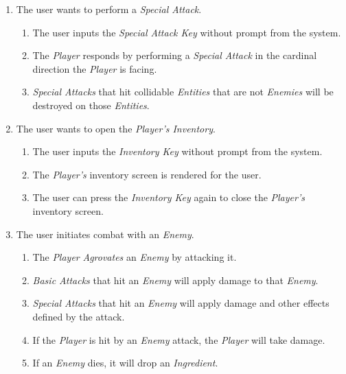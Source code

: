 \documentclass[12pt, titlepage]{article}
\begin{document}
\begin{enumerate}[{VP}1.]
\begin{enumerate}[{BE1}.1]
    \item The user wants to perform a \textit{Special Attack}.
    \begin{enumerate}
      \item The user inputs the \textit{Special Attack Key} without prompt from the system.
      \item The \textit{Player} responds by performing a \textit{Special Attack} in the cardinal direction the \textit{Player} is facing.
      \item \textit{Special Attacks} that hit collidable \textit{Entities} that are not \textit{Enemies} will be destroyed on those \textit{Entities}.
    \end{enumerate}
    
    \item The user wants to open the \textit{Player's Inventory}.
    \begin{enumerate}
      \item The user inputs the \textit{Inventory Key} without prompt from the system.
      \item The \textit{Player's} inventory screen is rendered for the user.
      \item The user can press the \textit{Inventory Key} again to close the \textit{Player's} inventory screen.
    \end{enumerate}

    \item The user initiates combat with an \textit{Enemy}.
    \begin{enumerate}
      \item The \textit{Player} \textit{Agrovates} an \textit{Enemy} by attacking it.
      \item \textit{Basic Attacks} that hit an \textit{Enemy} will apply damage to that \textit{Enemy}.
      \item \textit{Special Attacks} that hit an \textit{Enemy} will apply damage and other effects defined by the attack.
      \item If the \textit{Player} is hit by an \textit{Enemy} attack, the \textit{Player} will take damage.
      \item If an \textit{Enemy} dies, it will drop an \textit{Ingredient}.
    \end{enumerate}


\end{enumerate}
\end{enumerate}
\end{document}
